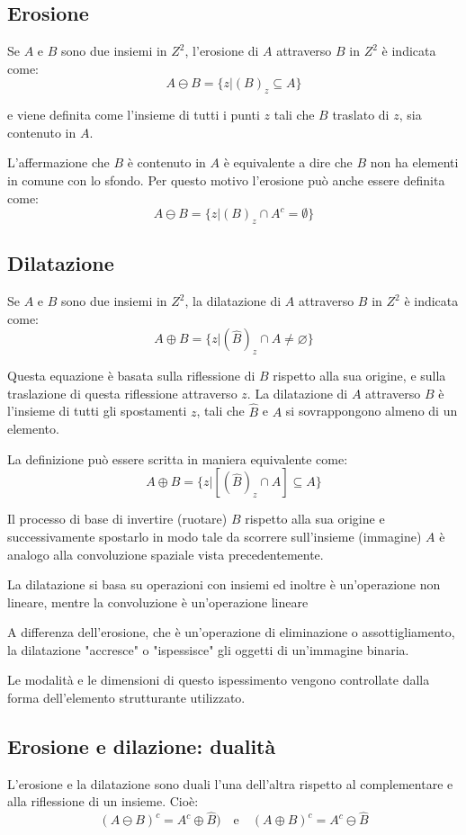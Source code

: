 \subsection{Erosione}
Se $A$ e $B$ sono due insiemi in $Z^2$, l'erosione di $A$ attraverso $B$ in $Z^2$ è indicata come:
$$
A \ominus B = \{z | (B)_z \subseteq A\}
$$

e viene definita come l'insieme di tutti i punti $z$ tali che $B$ traslato di $z$, sia contenuto in $A$.

L'affermazione che $B$ è contenuto in $A$ è equivalente a dire che $B$ non ha elementi in comune con lo sfondo. Per questo motivo l'erosione può anche essere definita come:
$$
A \ominus B = \{z | (B)_z \cap A^c = \emptyset \}
$$

\subsection{Dilatazione}
Se $A$ e $B$ sono due insiemi in $Z^2$, la dilatazione di $A$ attraverso $B$ in $Z^2$ è indicata come:
$$
A \oplus B = \{z | (\hat B)_z \cap A \neq \varnothing \}
$$

Questa equazione è basata sulla riflessione di $B$ rispetto alla sua origine, e sulla traslazione di questa riflessione attraverso $z$. La dilatazione di $A$ attraverso $B$ è l'insieme di tutti gli spostamenti $z$, tali che $\hat B$ e $A$ si sovrappongono almeno di un elemento.

La definizione può essere scritta in maniera equivalente come:
$$
A \oplus B = \{ z | [(\hat B)_z \cap A] \subseteq A \}
$$

Il processo di base di invertire (ruotare) $B$ rispetto alla sua origine e successivamente spostarlo in modo tale da scorrere sull'insieme (immagine) $A$ è analogo alla convoluzione spaziale vista precedentemente.

La dilatazione si basa su operazioni con insiemi ed inoltre è un'operazione non lineare, mentre la convoluzione è un'operazione lineare

A differenza dell'erosione, che è un'operazione di eliminazione o assottigliamento, la dilatazione "accresce" o "ispessisce" gli oggetti di un'immagine binaria.

Le modalità e le dimensioni di questo ispessimento vengono controllate dalla forma dell'elemento strutturante utilizzato.

\subsection{Erosione e dilazione: dualità}
L'erosione e la dilatazione sono duali l'una dell'altra rispetto al complementare e alla riflessione di un insieme. Cioè:
$$
(A \ominus B)^c = A^c \oplus \hat B ) \quad \text{e} \quad (A \oplus B)^c = A^c \ominus \hat B
$$

